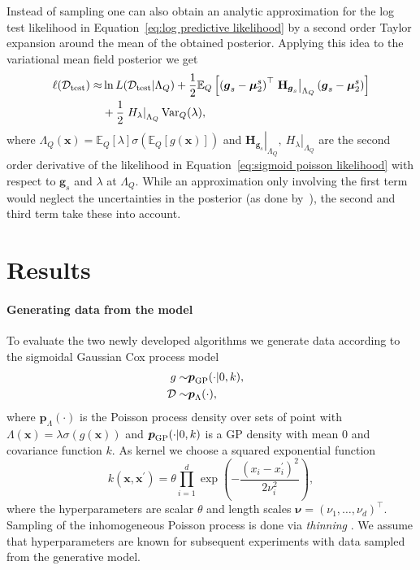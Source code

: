 \documentclass[twoside,11pt]{article}
\newcommand{\dataset}{{\cal D}}
\newcommand{\EE}[2]{\mathbb{E}_{#1}\left[ #2 \right]}
\newcommand{\bs}[1]{\boldsymbol{#1}}
\newcommand{\bx}{\boldsymbol{x}}
\newcommand{\bmu}{\boldsymbol{\mu}}
\newcommand{\bg}{\boldsymbol{g}}
\newcommand{\bnu}{\boldsymbol{\nu}}
\begin{document}
\noindent
Instead of sampling one can also obtain an analytic approximation for the log test likelihood in Equation~\eqref{eq:log predictive likelihood} by a second order Taylor expansion around the mean of the obtained posterior. Applying this idea to the variational mean field posterior we get
\begin{equation}\label{eq:expandend likelihood}
\begin{split}
\ell(\dataset_{\rm test}) \approx & \ln L(\dataset_{\rm test}\vert \Lambda_Q) + \frac{1}{2}\EE{Q}{\left(\bg_s - \bmu_2^s\right)^\top \left.\mathbf{H}_{\bg_s}\right\vert_{\Lambda_Q} \left(\bg_s - \bmu_2^s\right)} \\
& + \frac{1}{2}\left.H_\lambda\right\vert_{\Lambda_Q}{\rm Var}_{Q}(\lambda),
\end{split}
\end{equation}
where $\Lambda_Q(\bx) = \EE{Q}{\lambda}\sigma(\EE{Q}{g(\bx)})$ and $\left.\mathbf{H}_{\bg_s}\right\vert_{\Lambda_Q},\ \left.H_\lambda\right\vert_{\Lambda_Q}$ are the second order derivative of the likelihood in Equation~\eqref{eq:sigmoid poisson likelihood} with respect to $\bg_s$ and $\lambda$ at $\Lambda_Q$. While an approximation only involving the first term would neglect the uncertainties in the posterior (as done by~\citet{john2018large}), the second and third term take these into account.

\section{Results}\label{sec:results}
\paragraph{Generating data from the model} To evaluate the two newly developed algorithms we generate data according to the sigmoidal Gaussian Cox process model
\begin{eqnarray}
g \sim & \bs{p}_{\rm GP}(\cdot\vert 0, k), & \\
\dataset \sim & \bs{p}_{\Lambda}(\cdot), &
\end{eqnarray}
where $\bs{p}_{\Lambda}(\cdot)$ is the Poisson process density over sets of point with $\Lambda(\bx)=\lambda\sigma(g(\bx))$ and $\bs{p}_{\rm GP}(\cdot\vert 0, k)$ is a GP density with mean $0$ and covariance function $k$. As kernel we choose a squared exponential function
\begin{equation}
k(\bx,\bx^\prime) = \theta \prod_{i=1}^d \exp\left(-\frac{(x_i - x_i^\prime)^2}{2\nu_i^2}\right),
\end{equation}
where the hyperparameters are scalar $\theta$ and length scales $\bnu=(\nu_1,\ldots,\nu_d)^\top$. Sampling of the inhomogeneous Poisson process is done via {\it thinning} \citep{lewis1979simulation,adams2009tractable}. We assume that hyperparameters are known for subsequent experiments with data sampled from the generative model. 
\end{document}
